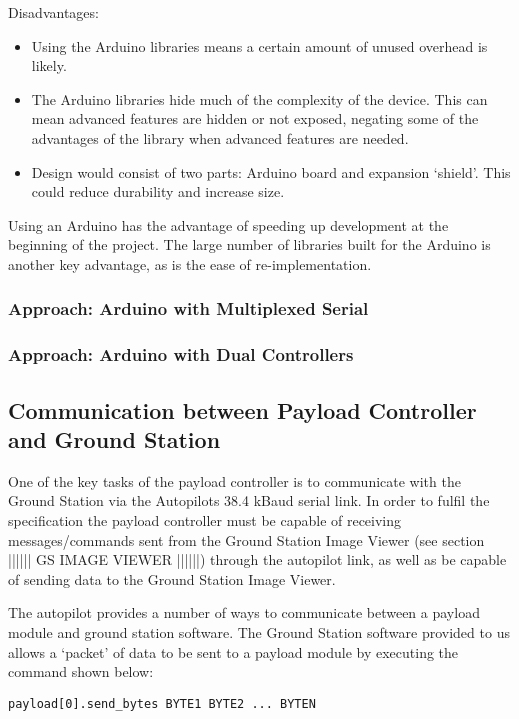 Disadvantages:
\begin{itemize}
\item Using the Arduino libraries means a certain amount of unused overhead is likely.

\item The Arduino libraries hide much of the complexity of the device. This can mean advanced features are hidden or not exposed, negating some of the advantages of the library when advanced features are needed.

\item Design would consist of two parts: Arduino board and expansion `shield'. This could reduce durability and increase size.
\end{itemize}

Using an Arduino has the advantage of speeding up development at the beginning of the project. The large number of libraries built for the Arduino is another key advantage, as is the ease of re-implementation.

\subsubsection{Approach: Arduino with Multiplexed Serial}

\subsubsection{Approach: Arduino with Dual Controllers}

\subsection{Communication between Payload Controller and Ground Station}
One of the key tasks of the payload controller is to communicate with the Ground Station via the Autopilots 38.4 kBaud serial link. In order to fulfil the specification the payload controller must be capable of receiving messages/commands sent from the Ground Station Image Viewer (see section |||||| GS IMAGE VIEWER ||||||) through the autopilot link, as well as be capable of sending data to the Ground Station Image Viewer.

The autopilot provides a number of ways to communicate between a payload module and ground station software. The Ground Station software provided to us allows a `packet' of data to be sent to a payload module by executing the command shown below:
\begin{verbatim} 
payload[0].send_bytes BYTE1 BYTE2 ... BYTEN 
\end{verbatim} 

